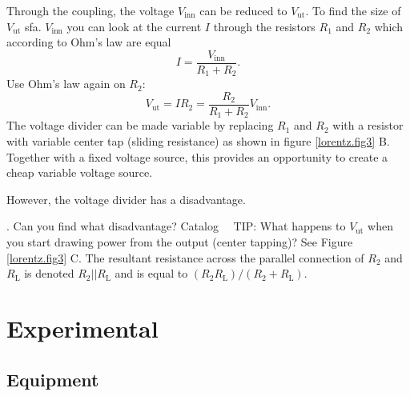 \documentclass[../Elmag-labhefte-2020.tex]{subfiles}
\begin{document}
%
Through the coupling, the voltage $V_\mathrm{inn}$ can be reduced to $V_\mathrm{ut}$. To find the size of $V_\mathrm{ut}$ sfa. $V_\mathrm{inn}$ you can look at the current $I$ through the resistors $R_1$ and $R_2$ which according to Ohm's law are equal
\begin{equation}
    I = \frac{V_\mathrm{inn}}{R_1 + R_2} .
\end{equation}
Use Ohm's law again on $R_2$:
\begin{equation}
    V_\mathrm{ut} 
        = I  R_2 
        = \frac{R_2}{R_1 + R_2} V_\mathrm{inn}.
\end{equation}
The voltage divider can be made variable by replacing $R_1$ and $R_2$ with a resistor with variable center tap (sliding resistance) as shown in figure \ref{lorentz.fig3} B. Together with a fixed voltage source, this provides an opportunity to create a cheap variable voltage source.

However, the voltage divider has a disadvantage.

{. Can you find what disadvantage? }
Catalog \ \
TIP: What happens to $V_\mathrm{ut}$ when you start drawing power from the output (center tapping)? See Figure \ref{lorentz.fig3} C. The resultant resistance across the parallel connection of $R_2$ and $R_\mathrm{L}$ is denoted $R_2||R_\mathrm{L}$ and is equal to $ (R_2R_\mathrm{L})/(R_2 + R_\mathrm{L})$.



\section{Experimental \label{ch.lorentz.eksp}}

\subsection{Equipment}
\end{document}
